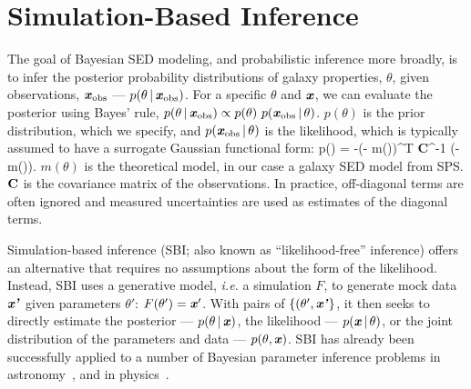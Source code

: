 \section{Simulation-Based Inference} \label{sec:sbi}
The goal of Bayesian SED modeling, and probabilistic inference more
broadly, is to infer the posterior probability distributions of galaxy
properties, $\theta$, given observations, $\textbf{\textit{x}}_{\rm obs}$  --- $p(\theta\,|\,\textbf{\textit{x}}_{\rm obs})$.
For a specific $\theta$ and $\textbf{\textit{x}}$, we can evaluate the posterior using
Bayes' rule, $p(\theta\,|\,\textbf{\textit{x}}_{\rm obs}) \propto p(\theta)~p(\textbf{\textit{x}}_{\rm obs}\,|\,\theta)$. 
$p(\theta)$ is the prior distribution, which we specify, and
$p(\textbf{\textit{x}}_{\rm obs}\,|\,\theta)$ is the likelihood, which is typically assumed to have a
surrogate Gaussian functional form: 
\beq
    \ln p(\xobs\given\theta) = -(\xobs - m(\theta))^T {\bf C}^{-1}
    (\xobs - m(\theta)).
\eeq
$m(\theta)$ is the theoretical model, in our case a galaxy SED model from SPS.
${\bf C}$ is the covariance matrix of the observations. 
In practice, off-diagonal terms are often ignored and measured uncertainties
are used as estimates of the diagonal terms. 


Simulation-based inference (SBI; also known as ``likelihood-free'' inference)
offers an alternative that requires no assumptions about the form of the
likelihood. 
Instead, SBI uses a generative model, \emph{i.e.} a simulation $F$, to generate
mock data $\textbf{\textit{x'}}$ given parameters $\theta'$: $F(\theta') = \textbf{\textit{x}}'$. 
With pairs of $\{(\theta', \textbf{\textit{x'}}\}$, it then seeks to directly estimate
the posterior --- $p(\theta\,|\, \textbf{\textit{x}})$, the likelihood ---
$p(\textbf{\textit{x}}\,|\, \theta)$, or the joint distribution of the parameters and data
--- $p(\theta, \textbf{\textit{x}})$. 
SBI has already been successfully applied to a number of Bayesian parameter
inference problems in astronomy~\citep[\emph{e.g.}][]{cameron2012, weyant2013,
hahn2017b, kacprzak2018, alsing2018, wong2020, huppenkothen2021, zhang2021},
and in physics~\citep[\emph{e.g.}][]{brehmer2019, cranmer2020}.


